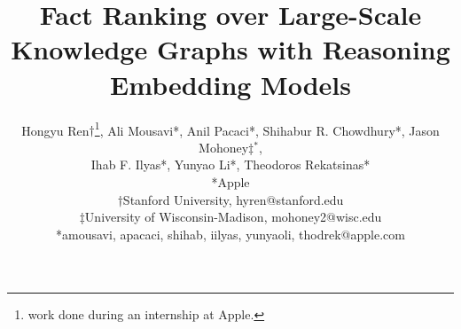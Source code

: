\documentclass[11pt]{article}
\begin{document}
\title{Fact Ranking over Large-Scale Knowledge Graphs with Reasoning Embedding Models}

\author{Hongyu Ren$\dagger$\footnote{work done during an internship at Apple.}, Ali Mousavi*, Anil Pacaci*, Shihabur R. Chowdhury*, Jason Mohoney$\ddagger$$^*$, \\ Ihab F. Ilyas*, Yunyao Li*, Theodoros Rekatsinas*\\
  *Apple \\
  $\dagger$Stanford University, hyren@stanford.edu \\
  $\ddagger$University of Wisconsin-Madison, mohoney2@wisc.edu\\
  *{amousavi, apacaci, shihab, iilyas, yunyaoli, thodrek}@apple.com
}


\maketitle
\renewcommand\thesection{\arabic{section}}
\setcounter{section}{0}
\setcounter{figure}{0}
\setcounter{table}{0}










% 


\end{document}
